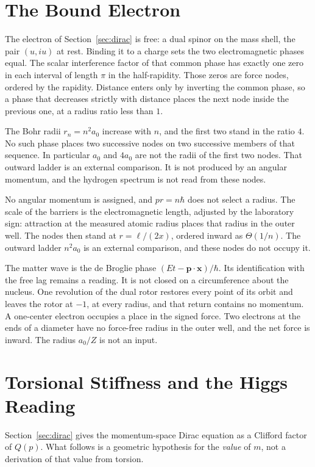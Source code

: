 \documentclass[a4paper]{article}
\begin{document}
\section{The Bound Electron}
\label{sec:orbit}

The electron of Section~\ref{sec:dirac} is free: a dual spinor on the mass shell, the pair $(u,iu)$ at rest. Binding it to a charge sets the two electromagnetic phases equal. The scalar interference factor of that common phase has exactly one zero in each interval of length $\pi$ in the half-rapidity. Those zeros are force nodes, ordered by the rapidity. Distance enters only by inverting the common phase, so a phase that decreases strictly with distance places the next node inside the previous one, at a radius ratio less than $1$.

The Bohr radii $r_n=n^2 a_0$ increase with $n$, and the first two stand in the ratio $4$. No such phase places two successive nodes on two successive members of that sequence. In particular $a_0$ and $4a_0$ are not the radii of the first two nodes. That outward ladder is an external comparison. It is not produced by an angular momentum, and the hydrogen spectrum is not read from these nodes.

No angular momentum is assigned, and \(pr=n\hbar\) does not select a radius. The scale of the barriers is the electromagnetic length, adjusted by the laboratory sign: attraction at the measured atomic radius places that radius in the outer well. The nodes then stand at \(r=\ell/(2x)\), ordered inward as \(\Theta(1/n)\). The outward ladder \(n^2 a_0\) is an external comparison, and these nodes do not occupy it.

The matter wave is the de Broglie phase \((Et-\mathbf{p}\cdot\mathbf{x})/\hbar\). Its identification with the free lag remains a reading. It is not closed on a circumference about the nucleus. One revolution of the dual rotor restores every point of its orbit and leaves the rotor at \(-1\), at every radius, and that return contains no momentum. A one-center electron occupies a place in the signed force. Two electrons at the ends of a diameter have no force-free radius in the outer well, and the net force is inward. The radius \(a_0/Z\) is not an input.

\section{Torsional Stiffness and the Higgs Reading}
\label{sec:mass}

Section~\ref{sec:dirac} gives the momentum-space Dirac equation as a Clifford factor of $Q(p)$. What follows is a geometric hypothesis for the \emph{value} of $m$, not a derivation of that value from torsion.
\end{document}
